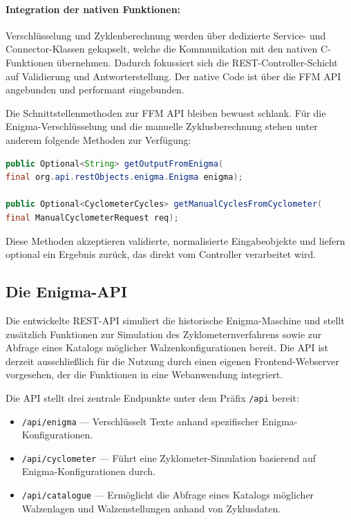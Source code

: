 \documentclass[12pt, ngerman, a4paper, numbers=noenddot]{article}
\begin{document}
\paragraph{Integration der nativen Funktionen:}

Verschlüsselung und Zyklenberechnung werden über dedizierte Service- und Connector-Klassen gekapselt, welche die Kommunikation mit den nativen C-Funktionen übernehmen. Dadurch fokussiert sich die REST-Controller-Schicht auf Validierung und Antworterstellung. Der native Code ist über die FFM API angebunden und performant eingebunden.


Die Schnittstellenmethoden zur FFM API bleiben bewusst schlank. Für die Enigma-Verschlüsselung und die manuelle Zyklusberechnung stehen unter anderem folgende Methoden zur Verfügung:

\begin{lstlisting}[language=Java, caption={Schnittstellenmethoden zur nativen FFM API}, label=lst:native-methods]
public Optional<String> getOutputFromEnigma(
final org.api.restObjects.enigma.Enigma enigma);

public Optional<CyclometerCycles> getManualCyclesFromCyclometer(
final ManualCyclometerRequest req);
\end{lstlisting}

Diese Methoden akzeptieren validierte, normalisierte Eingabeobjekte und liefern optional ein Ergebnis zurück, das direkt vom Controller verarbeitet wird.





\subsection{Die Enigma-API}
\label{subsec:enigma-api}
Die entwickelte REST-API simuliert die historische Enigma-Maschine und stellt zusätzlich Funktionen zur Simulation des Zyklometernverfahrens sowie zur Abfrage eines Katalogs möglicher Walzenkonfigurationen bereit. Die API ist derzeit ausschließlich für die Nutzung durch einen eigenen Frontend-Webserver vorgesehen, der die Funktionen in eine Webanwendung integriert.

Die API stellt drei zentrale Endpunkte unter dem Präfix \lstinline|/api| bereit:

\begin{itemize}
	\item \lstinline|/api/enigma| — Verschlüsselt Texte anhand spezifischer Enigma\hyp{}Konfigurationen.
	\item \lstinline|/api/cyclometer| — Führt eine Zyklometer-Simulation basierend auf Enigma\hyp{}Konfigurationen durch.
	\item \lstinline|/api/catalogue| — Ermöglicht die Abfrage eines Katalogs möglicher Walzenlagen und Walzenstellungen anhand von Zyklusdaten.
\end{itemize}
\end{document}
